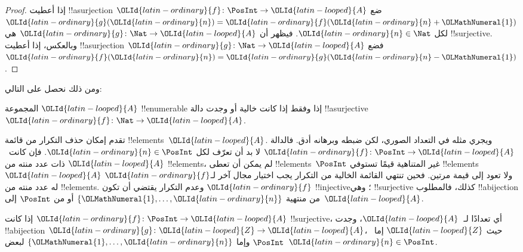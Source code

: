 \documentclass[../../../include/open-logic-section]{subfiles}
\begin{document}
\begin{proof}
إذا أعطيت !!a{surjection} $\OLId{latin-ordinary}{f}\colon \PosInt \to \OLId{latin-looped}{A}$ ضع $\OLId{latin-ordinary}{g}(\OLId{latin-ordinary}{n}) = \OLId{latin-ordinary}{f}(\OLId{latin-ordinary}{n}+\OLMathNumeral{1})$
لكل $\OLId{latin-ordinary}{n} \in \Nat$. فيظهر أن $\OLId{latin-ordinary}{g}\colon \Nat \to \OLId{latin-looped}{A}$ هي !!{surjective}.
وبالعكس، إذا أعطيت !!a{surjection} $\OLId{latin-ordinary}{g}\colon \Nat \to \OLId{latin-looped}{A}$
فضع $\OLId{latin-ordinary}{f}(\OLId{latin-ordinary}{n}) = \OLId{latin-ordinary}{g}(\OLId{latin-ordinary}{n}-\OLMathNumeral{1})$.
\end{proof}

ومن ذلك نحصل على التالي:

\begin{cor}
المجموعة $\OLId{latin-looped}{A}$ !!{enumerable} إذا وفقط إذا كانت خالية أو وجدت دالة
!!a{surjective} $\OLId{latin-ordinary}{f}\colon \Nat \to \OLId{latin-looped}{A}$.
\end{cor}

تقدم إمكان حذف التكرار من قائمة !!{element}s~$\OLId{latin-looped}{A}$.
ويجري مثله في التعداد الصوري، لكن ضبطه وبرهانه أدق.
فالدالة $\OLId{latin-ordinary}{f}\colon \PosInt \to \OLId{latin-looped}{A}$ لا بد أن تعرّف لكل $\OLId{latin-ordinary}{n} \in \PosInt$.
فإن كانت~$\OLId{latin-looped}{A}$ ذات عدد منته من !!{element}s، لم يمكن أن تعطى
!!{element}s~$\PosInt$ غير المتناهية قيمًا تستوفي !!{element}s~$\OLId{latin-looped}{A}$
ولا تعود إلى قيمة مرتين. فحين تنتهي القائمة الخالية من التكرار
يجب اختيار مجال آخر لـ$\OLId{latin-ordinary}{f}$ له عدد منته من !!{element}s.
وعدم التكرار يقتضي أن تكون $\OLId{latin-ordinary}{f}$ !!{injective}؛ وهي !!{surjective}
كذلك، فالمطلوب !!a{bijection} من منتهية $\{\OLMathNumeral{1}, \dots, \OLId{latin-ordinary}{n}\}$
أو من $\PosInt$ إلى~$\OLId{latin-looped}{A}$.

\begin{prop}
إذا كانت $\OLId{latin-ordinary}{f}\colon \PosInt \to \OLId{latin-looped}{A}$ !!{surjective}، أي تعدادًا لـ~$\OLId{latin-looped}{A}$،
وجدت !!a{bijection} $\OLId{latin-ordinary}{g}\colon \OLId{latin-looped}{Z} \to \OLId{latin-looped}{A}$، حيث $\OLId{latin-looped}{Z}$ إما~$\PosInt$
وإما $\{\OLMathNumeral{1}, \dots, \OLId{latin-ordinary}{n}\}$ لبعض~$\OLId{latin-ordinary}{n} \in \PosInt$.
\end{prop}
\end{document}
